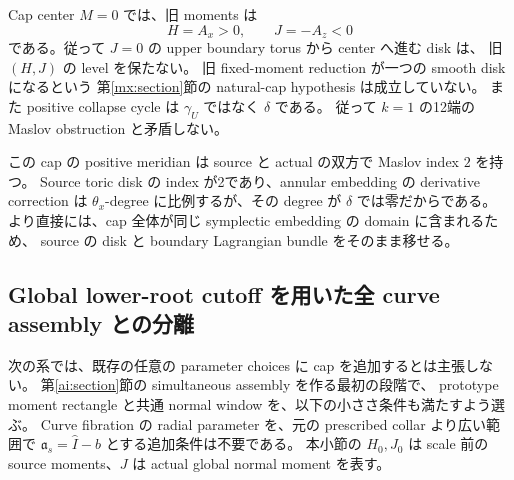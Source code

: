 Cap center $M=0$ では、旧 moments は
\[
 H=A_x>0,\qquad J=-A_z<0
\]
である。従って $J=0$ の upper boundary torus から center へ進む disk は、
旧 $(H,J)$ の level を保たない。
旧 fixed-moment reduction が一つの smooth disk になるという
第\ref{mx:section}節の natural-cap hypothesis は成立していない。
また positive collapse cycle は $\gamma_U$ ではなく $\delta$ である。
従って $k=1$ の12端の Maslov obstruction と矛盾しない。

この cap の positive meridian は source と actual の双方で Maslov index $2$ を持つ。
Source toric disk の index が2であり、annular embedding の derivative correction は
$\theta_x$-degree に比例するが、その degree が $\delta$ では零だからである。
より直接には、cap 全体が同じ symplectic embedding の domain に含まれるため、
source の disk と boundary Lagrangian bundle をそのまま移せる。

\subsection{Global lower-root cutoff を用いた全 curve assembly との分離}

次の系では、既存の任意の parameter choices に cap を追加するとは主張しない。
第\ref{ai:section}節の simultaneous assembly を作る最初の段階で、
prototype moment rectangle と共通 normal window を、以下の小ささ条件も満たすよう選ぶ。
Curve fibration の radial parameter を、元の prescribed collar より広い範囲で
$\mathfrak a_s=\widehat I-b$ とする追加条件は不要である。
本小節の $H_0,J_0$ は scale 前の source moments、$J$ は actual global normal moment を表す。

